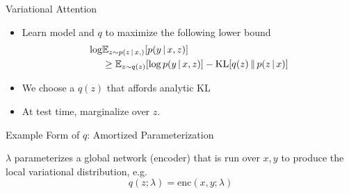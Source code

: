 \begin{frame}{Variational Attention}
\begin{itemize}
    \item Learn model and $q$ to maximize the following lower bound
        \begin{align*}
        \log &\mathbb{E}_{z \sim p(z \,|\, x,)}[p(y \,|\, x, z)]\\
        &\ge\mathbb{E}_{z \sim q(z)}[\log p(y \,|\, x, z)] - \operatorname*{KL}[q(z) \, \Vert \, p(z
  \,|\, x)]
        \end{align*}
    \item We choose a $q(z)$ that affords analytic KL
    \item At test time, marginalize over $z$.
\end{itemize}
\end{frame}


\begin{frame}
{Example Form of $q$: Amortized Parameterization}
\begin{center}
\end{center}
$\lambda$ parameterizes a global network (encoder) that is run over $x, y$
    to produce the local variational distribution, e.g.
    \[ q(z ; \lambda) = \text{enc}(x,  y ; \lambda)\]
\end{frame}

